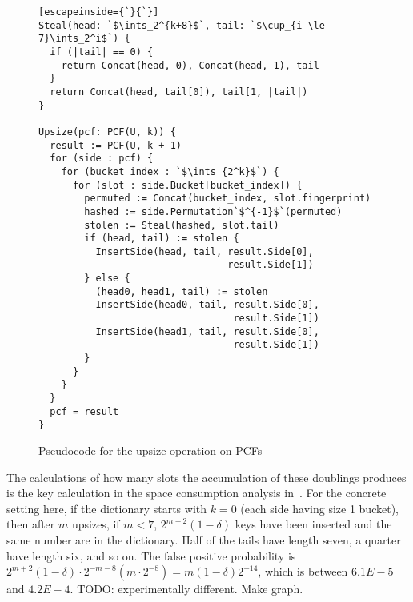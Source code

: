 \documentclass[letterpaper, 11pt]{article}
\newcommand{\ints}{\mathbb{Z}}
\begin{document}
\begin{figure}
\begin{lstlisting}[escapeinside={`}{`}]
Steal(head: `$\ints_2^{k+8}$`, tail: `$\cup_{i \le 7}\ints_2^i$`) {
  if (|tail| == 0) {
    return Concat(head, 0), Concat(head, 1), tail
  }
  return Concat(head, tail[0]), tail[1, |tail|)
}

Upsize(pcf: PCF(U, k)) {
  result := PCF(U, k + 1)
  for (side : pcf) {
    for (bucket_index : `$\ints_{2^k}$`) {
      for (slot : side.Bucket[bucket_index]) {
        permuted := Concat(bucket_index, slot.fingerprint)
        hashed := side.Permutation`$^{-1}$`(permuted)
        stolen := Steal(hashed, slot.tail)
        if (head, tail) := stolen {
          InsertSide(head, tail, result.Side[0],
                                 result.Side[1])
        } else {
          (head0, head1, tail) := stolen
          InsertSide(head0, tail, result.Side[0],
                                  result.Side[1])
          InsertSide(head1, tail, result.Side[0],
                                  result.Side[1])
        }
      }
    }
  }
  pcf = result
}
\end{lstlisting}
\caption{Pseudocode for the upsize operation on PCFs}
\end{figure}

The calculations of how many slots the accumulation of these doublings produces is the key calculation in the space consumption analysis in~\cite{psw}.
For the concrete setting here, if the dictionary starts with $k = 0$ (each side having size 1 bucket), then after $m$ upsizes, if $m < 7$, $2^{m+2}(1 - \delta)$ keys have been inserted and the same number are in the dictionary.
Half of the tails have length seven, a quarter have length six, and so on.
The false positive probability is $2^{m+2}(1 - \delta) \cdot 2^{-m-8}(m \cdot 2^{-8}) = m(1-\delta)2^{-14}$, which is between $6.1E-5$ and $4.2E-4$.
TODO: experimentally different. Make graph.





\end{document}
